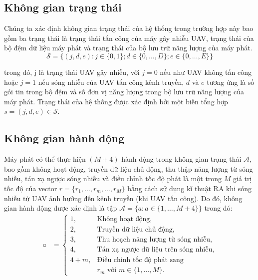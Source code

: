 \documentclass{uetgraduation}
\begin{document}
\subsection{Không gian trạng thái}
Chúng ta xác định không gian trạng thái của hệ thống trong trường hợp này bao gồm ba trạng thái là trạng thái tấn công của máy gây nhiễu UAV, trạng thái của bộ đệm dữ liệu máy phát và trạng thái của bộ lưu
trữ năng lượng của máy phát.
\begin{equation}
    \mathcal{S} = \{(j, d, e) : j \in \{0, 1\}; d \in \{0, \dots, D\}; e \in \{0, \dots, E\}\}
\end{equation}

trong đó, j là trạng thái UAV gây nhiễu, với $j = 0$ nếu như UAV không tấn công hoặc $j = 1$ nếu sóng nhiễu của UAV tấn công kênh truyền, $d$ và $e$ tương ứng là số gói tin trong bộ
đệm và số đơn vị năng lượng trong bộ lưu trữ năng lượng của máy phát. Trạng thái của hệ thống được xác định bởi một biến tổng hợp $s = (j, d, e) \in \mathcal{S}$.

\subsection{Không gian hành động}
Máy phát có thể thực hiện $(M+4)$ hành động trong không gian trạng thái $\mathcal{A}$, bao gồm không hoạt động, truyền dữ liệu chủ động, thu thập năng lượng từ sóng nhiễu, tán xạ ngược sóng
nhiễu và điều chỉnh tốc độ phát là một trong $M$ giá trị tốc độ của vector $r = \{r_1, \dots, r_m,\dots, r_M\}$ bằng cách sử dụng kĩ thuật RA khi sóng nhiễu từ UAV ảnh hưởng đến
kênh truyền (khi UAV tấn công). Do đó, không gian hành động được xác định là tập $\mathcal{A} = \{a : a \in \{1, \dots, M+4\}\}$ trong đó:
\begin{equation}
    \begin{split}
        a &= \begin{cases}
            1, & \text{Không hoạt động,} \\
            2, & \text{Truyền dữ liệu chủ động,} \\
            3, & \text{Thu hoạch năng lượng từ sóng nhiễu,} \\
            4, & \text{Tán xạ ngược dữ liệu trên sóng nhiễu,} \\
            4 + m, & \text{Điều chỉnh tốc độ phát sang } \\
                    & r_m \text{ với } m \in \{1, \ldots, M\}.
        \end{cases}
    \end{split}
\end{equation}
\end{document}
